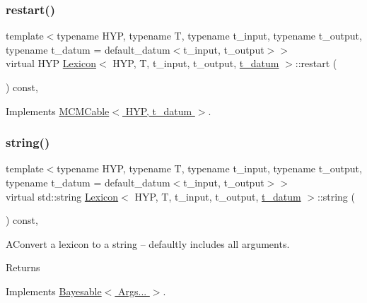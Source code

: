 \subsubsection{\texorpdfstring{restart()}{restart()}}
{\footnotesize\ttfamily template$<$typename H\+YP, typename T, typename t\+\_\+input, typename t\+\_\+output, typename t\+\_\+datum = default\+\_\+datum$<$t\+\_\+input, t\+\_\+output$>$$>$ \\
virtual H\+YP \hyperlink{class_lexicon}{Lexicon}$<$ H\+YP, T, t\+\_\+input, t\+\_\+output, \hyperlink{class_bayesable_a7c93a2eeab708378eb321745908718d4}{t\+\_\+datum} $>$\+::restart (\begin{DoxyParamCaption}{ }\end{DoxyParamCaption}) const\hspace{0.3cm}{\ttfamily [inline]}, {\ttfamily [virtual]}}



Implements \hyperlink{class_m_c_m_cable_a220d6c4ca73e20441c14fa5bd3e090d3}{M\+C\+M\+Cable$<$ H\+Y\+P, t\+\_\+datum $>$}.

\mbox{\label{class_lexicon_a25895445cc5f7337e299e8d9dd14822c}} 
\subsubsection{\texorpdfstring{string()}{string()}}
{\footnotesize\ttfamily template$<$typename H\+YP, typename T, typename t\+\_\+input, typename t\+\_\+output, typename t\+\_\+datum = default\+\_\+datum$<$t\+\_\+input, t\+\_\+output$>$$>$ \\
virtual std\+::string \hyperlink{class_lexicon}{Lexicon}$<$ H\+YP, T, t\+\_\+input, t\+\_\+output, \hyperlink{class_bayesable_a7c93a2eeab708378eb321745908718d4}{t\+\_\+datum} $>$\+::string (\begin{DoxyParamCaption}{ }\end{DoxyParamCaption}) const\hspace{0.3cm}{\ttfamily [inline]}, {\ttfamily [virtual]}}

A\+Convert a lexicon to a string -- defaultly includes all arguments. \begin{DoxyReturn}{Returns}

\end{DoxyReturn}


Implements \hyperlink{class_bayesable_a2ec58e98bf37a90ac3d45a7713c6d5ea}{Bayesable$<$ Args... $>$}.




